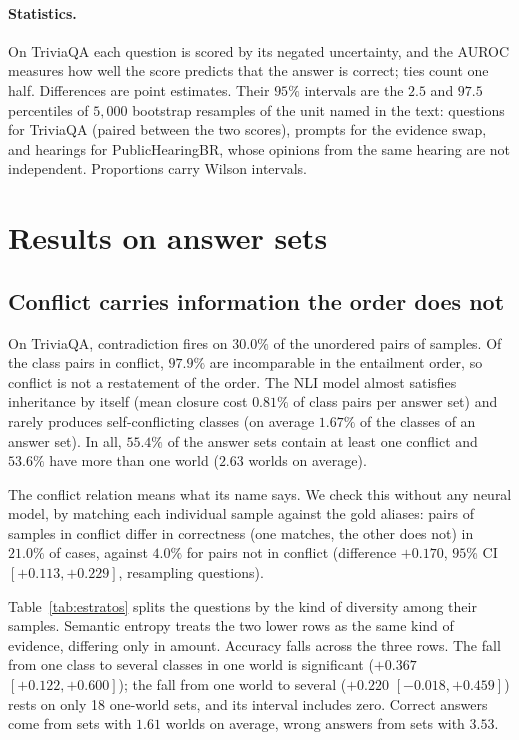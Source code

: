 \documentclass[english]{desafiokunumi}
\theoremstyle{definition}
\theoremstyle{remark}
\begin{document}
\paragraph{Statistics.} On TriviaQA each question is scored by its negated
uncertainty, and the AUROC measures how well the score predicts that the
answer is correct; ties count one half. Differences are point estimates. Their
$95\%$ intervals are the $2.5$ and $97.5$ percentiles of $5{,}000$ bootstrap
resamples of the unit named in the text: questions for TriviaQA (paired
between the two scores), prompts for the evidence swap, and hearings for
PublicHearingBR, whose opinions from the same hearing are not independent.
Proportions carry Wilson intervals.

\section{Results on answer sets}
\label{sec:res}

\subsection{Conflict carries information the order does not}
\label{sec:res-tqa}

On TriviaQA, contradiction fires on $30.0\%$ of the unordered pairs of samples.
Of the class pairs in conflict, $97.9\%$ are incomparable in the entailment
order, so conflict is not a restatement of the order. The NLI model almost
satisfies inheritance by itself (mean closure cost $0.81\%$ of class pairs per
answer set) and rarely produces self-conflicting classes (on average $1.67\%$
of the classes of an answer set). In all, $55.4\%$ of the
answer sets contain at least one conflict and $53.6\%$ have more than one world
($2.63$ worlds on average).

The conflict relation means what its name says. We check this without any
neural model, by matching each individual sample against the gold aliases:
pairs of samples in conflict differ in correctness (one matches, the other does
not) in $21.0\%$ of cases, against $4.0\%$ for pairs not in conflict
(difference $+0.170$, $95\%$ CI $[+0.113, +0.229]$, resampling questions).

Table~\ref{tab:estratos} splits the questions by the kind of diversity among
their samples. Semantic entropy treats the two lower rows as the same kind of
evidence, differing only in amount. Accuracy falls across the three rows. The
fall from one class to several classes in one world is significant
($+0.367$ $[+0.122, +0.600]$); the fall from one world to several
($+0.220$ $[-0.018, +0.459]$) rests on only 18 one-world sets, and its
interval includes zero. Correct answers come from sets with $1.61$
worlds on average, wrong answers from sets with $3.53$.
\end{document}

